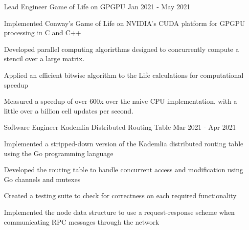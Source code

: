 

\begin{cventries}

  \cventry
    {Lead Engineer} %
    {Game of Life on GPGPU} %
    {} %
    {Jan 2021 - May 2021} %
    {
      \begin{cvitems} %
        \item Implemented Conway's Game of Life on NVIDIA's CUDA platform for GPGPU processing in C and C++
        \item Developed parallel computing algorirthms designed to concurrently compute a stencil over a large matrix.
        \item Applied an efficient bitwise algorithm to the Life calculations for computational speedup
        \item Measured a speedup of over 600x over the naive CPU implementation, with a little over a billion cell updates per second.
      \end{cvitems}
    }

  \cventry
    {Software Engineer} %
    {Kademlia Distributed Routing Table} %
    {} %
    {Mar 2021 - Apr 2021} %
    {
      \begin{cvitems} %
        \item Implemented a stripped-down version of the Kademlia distributed routing table using the Go programming language
        \item Developed the routing table to handle concurrent access and modification using Go channels and mutexes
        \item Created a testing suite to check for correctness on each required functionality
        \item Implemented the node data structure to use a request-response scheme when communicating RPC messages through the network
      \end{cvitems}
    }


\end{cventries}

